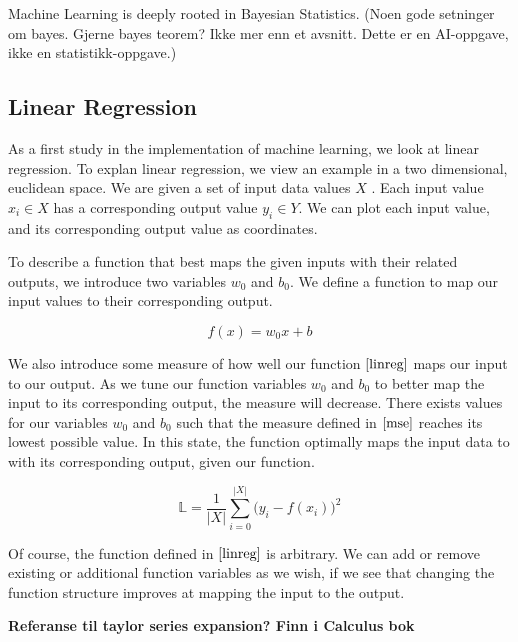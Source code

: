 Machine Learning is deeply rooted in Bayesian Statistics. (Noen gode setninger om bayes. Gjerne bayes teorem? Ikke mer enn et avsnitt. Dette er en AI-oppgave, ikke en statistikk-oppgave.)


\subsection{Linear Regression}

As a first study in the implementation of machine learning, we look at linear regression.
To explan linear regression, we view an example in a two dimensional, euclidean space.
We are given a set of input data values $ X $ . Each input value $ x_i \in X $ has a corresponding output value $ y_i \in Y $.
We can plot each input value, and its corresponding output value as coordinates.


To describe a function that best maps the given inputs with their related outputs, 
we introduce two variables $ w_0 $ and $ b_0 $. We define a function to map our input values to their corresponding output.

\[
        f(x) = w_0x + b \tag{2.1} \label{linreg}
\]

We also introduce some measure of how well our function $ \eqref{linreg} $
maps our input to our output. As we tune our function variables $ w_0 $ and $ b_0 $ to better map the input to its corresponding output,
the measure will decrease. There exists values for our variables $ w_0 $ and $ b_0 $  such that the measure defined in $ \eqref{mse} $ reaches its lowest possible value.
In this state, the function optimally maps the input data to with its corresponding output, given our function.

\[
    \mathbb{L} = \frac{1}{|X|}\sum_{i = 0}^{|X|} \big(y_i - f(x_i)\big)^2 \tag{2.2} \label{mse}
\]

Of course, the function defined in $ \eqref{linreg} $ is arbitrary. 
We can add or remove existing or additional function variables as we wish,
if we see that changing the function structure improves at mapping the input to the output.
 
\textbf{Referanse til taylor series expansion? Finn i Calculus bok}

